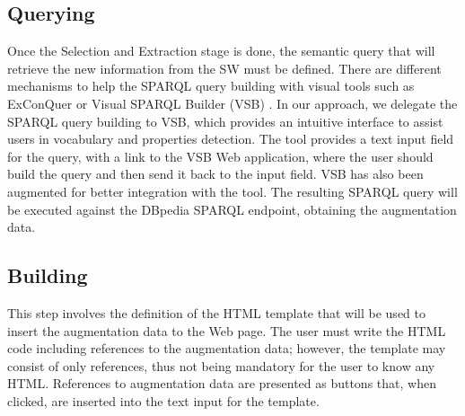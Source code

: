 \documentclass[runningheads]{llncs}
\begin{document}



\subsection{Querying}


Once the Selection and Extraction stage is done, the semantic query that will retrieve the new information from the SW must be defined. There are different mechanisms to help the SPARQL query building with visual tools such as ExConQuer \cite{Attard2017ExConQuerRe-use} or Visual SPARQL Builder (VSB) \cite{mci/Eipert2015}. In our approach, we delegate the SPARQL query building to VSB, which provides an intuitive interface to assist users in vocabulary and properties detection.
The tool provides a text input field for the query, with a link to the VSB Web application, where the user should build the query and then send it back to the input field. VSB has also been augmented for better integration with the tool. The resulting SPARQL query will be executed against the DBpedia SPARQL endpoint, obtaining the augmentation data.

\subsection{Building}




This step involves the definition of the HTML template that will be used to insert the augmentation data to the Web page. The user must write the HTML code including references to the augmentation data; however, the template may consist of only references, thus not being mandatory for the user to know any HTML. References to augmentation data are presented as buttons that, when clicked, are inserted into the text input for the template.
\end{document}
